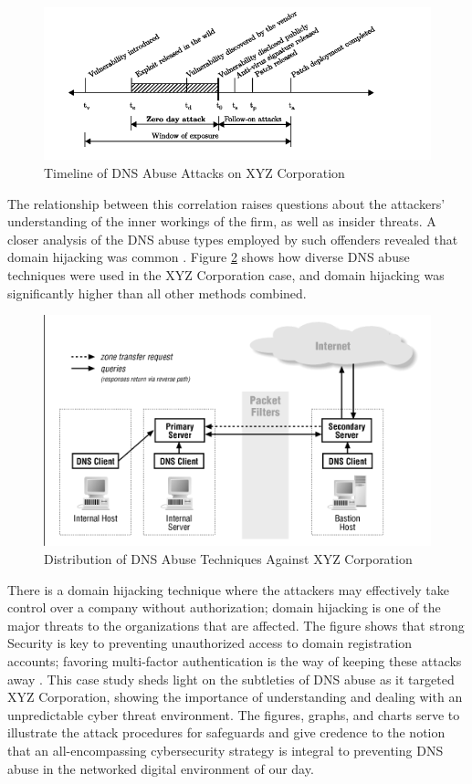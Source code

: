 \begin{figure}[ht]
\centering
\includegraphics{background/XYZ1.png}
\caption{Timeline of DNS Abuse Attacks on XYZ Corporation}
\label{fig:figureOne}
\end{figure}

The relationship between this correlation raises questions about the attackers' understanding of the inner workings of the firm, as well as insider threats. A closer analysis of the DNS abuse types employed by such offenders revealed that domain hijacking was common \cite{bayer2022study}. Figure \ref{fig:figureTwo} shows how diverse DNS abuse techniques were used in the XYZ Corporation case, and domain hijacking was significantly higher than all other methods combined.

\begin{figure}[ht]
\centering
\includegraphics{background/XYZ2.png}
\caption{Distribution of DNS Abuse Techniques Against XYZ Corporation}
\label{fig:figureTwo}
\end{figure}

There is a domain hijacking technique where the attackers may effectively take control over a company without authorization; domain hijacking is one of the major threats to the organizations that are affected. The figure shows that strong Security is key to preventing unauthorized access to domain registration accounts; favoring multi-factor authentication is the way of keeping these attacks away \cite{paz2020cyber}. This case study sheds light on the subtleties of DNS abuse as it targeted XYZ Corporation, showing the importance of understanding and dealing with an unpredictable cyber threat environment. The figures, graphs, and charts serve to illustrate the attack procedures for safeguards and give credence to the notion that an all-encompassing cybersecurity strategy is integral to preventing DNS abuse in the networked digital environment of our day.

